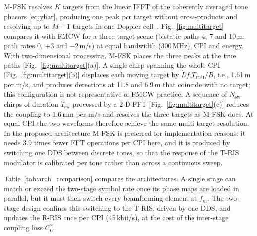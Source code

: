 \documentclass[journal]{IEEEtran}
\newcommand{\Tris}{T-RIS}
\newcommand{\Rris}{R-RIS}
\begin{document}
M-FSK resolves $K$ targets from the linear IFFT of the coherently averaged tone phasors \eqref{eq:ybar}, producing one peak per target without cross-products and resolving up to $M-1$ targets in one Doppler cell~\cite{rohling2001waveform}. Fig.~\ref{fig:multitarget} compares it with FMCW for a three-target scene (bistatic paths 4, 7 and 10\,m; path rates 0, $+3$ and $-2$\,m/s) at equal bandwidth (300\,MHz), CPI and energy. With two-dimensional processing, M-FSK places the three peaks at the true paths [Fig.~\ref{fig:multitarget}(a)]. A single chirp spanning the whole CPI [Fig.~\ref{fig:multitarget}(b)] displaces each moving target by $\dot L f_c T_{\mathrm{CPI}}/B$, i.e., 1.61\,m per m/s, and produces detections at 11.8 and 6.9\,m that coincide with no target; this configuration is not representative of FMCW practice. A sequence of $N_{\mathrm{sw}}$ chirps of duration $T_{\mathrm{sw}}$ processed by a 2-D FFT [Fig.~\ref{fig:multitarget}(c)] reduces the coupling to 1.6\,mm per m/s and resolves the three targets as M-FSK does. At equal CPI the two waveforms therefore achieve the same multi-target resolution. In the proposed architecture M-FSK is preferred for implementation reasons: it needs 3.9 times fewer FFT operations per CPI here, and it is produced by switching one DDS between discrete tones, so that the response of the \Tris{} modulator is calibrated per tone rather than across a continuous sweep.

Table~\ref{tab:arch_comparison} compares the architectures. A single stage can match or exceed the two-stage symbol rate once its phase maps are loaded in parallel, but it must then switch every beamforming element at $f_m$. The two-stage design confines this switching to the \Tris{}, driven by one DDS, and updates the \Rris{} once per CPI (45\,kbit/s), at the cost of the inter-stage coupling loss $C_0^2$.
\end{document}
